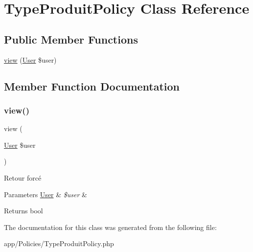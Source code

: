 \hypertarget{class_app_1_1_policies_1_1_type_produit_policy}{}\section{Type\+Produit\+Policy Class Reference}
\label{class_app_1_1_policies_1_1_type_produit_policy}
\subsection*{Public Member Functions}
\begin{DoxyCompactItemize}
\item 
\mbox{\hyperlink{class_app_1_1_policies_1_1_type_produit_policy_a7d2bfa2eab20cb1de3a321632440c315}{view}} (\mbox{\hyperlink{class_app_1_1_user}{User}} \$user)
\end{DoxyCompactItemize}


\subsection{Member Function Documentation}
\mbox{\label{class_app_1_1_policies_1_1_type_produit_policy_a7d2bfa2eab20cb1de3a321632440c315}} 
\subsubsection{\texorpdfstring{view()}{view()}}
{\footnotesize\ttfamily view (\begin{DoxyParamCaption}\item[{\mbox{\hyperlink{class_app_1_1_user}{User}}}]{\$user }\end{DoxyParamCaption})}

Retour forcé 
\begin{DoxyParams}[1]{Parameters}
\mbox{\hyperlink{class_app_1_1_user}{User}} & {\em \$user} & \\
\hline
\end{DoxyParams}
\begin{DoxyReturn}{Returns}
bool 
\end{DoxyReturn}


The documentation for this class was generated from the following file\+:\begin{DoxyCompactItemize}
\item 
app/\+Policies/Type\+Produit\+Policy.\+php\end{DoxyCompactItemize}
